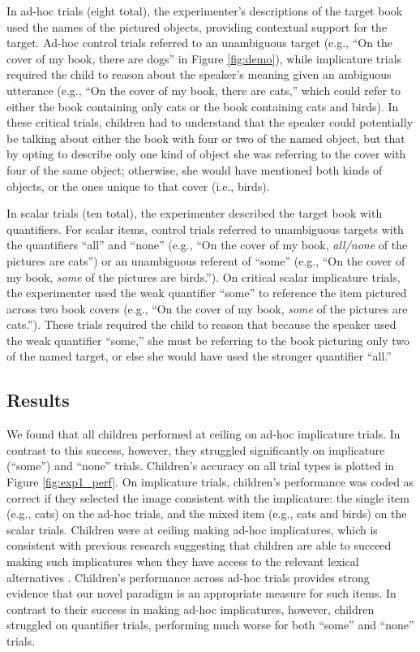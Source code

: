 \documentclass[man]{apa2}
\begin{document}
In ad-hoc trials (eight total), the experimenter's descriptions of the target book used the names of the pictured objects, providing contextual support for the target. Ad-hoc control trials referred to an unambiguous target (e.g., ``On the cover of my book, there are dogs'' in Figure \ref{fig:demo}), while implicature trials required the child to reason about the speaker's meaning given an ambiguous utterance (e.g., ``On the cover of my book, there are cats,'' which could refer to either the book containing only cats or the book containing cats and birds). In these critical trials, children had to understand that the speaker could potentially be talking about either the book with four or two of the named object, but that by opting to describe only one kind of object she was referring to the cover with four of the same object; otherwise, she would have mentioned both kinds of objects, or the ones unique to that cover (i.e., birds).

In scalar trials (ten total), the experimenter described the target book with quantifiers. For scalar items, control trials referred to unambiguous targets with the quantifiers ``all'' and ``none'' (e.g., ``On the cover of my book, \textit{all/none} of the pictures are cats'') or an unambiguous referent of ``some'' (e.g., ``On the cover of my book, \textit{some} of the pictures are birds.''). On critical scalar implicature trials, the experimenter used the weak quantifier ``some'' to reference the item pictured across two book covers (e.g., ``On the cover of my book, \textit{some} of the pictures are cats.''). These trials required the child to reason that because the speaker used the weak quantifier ``some,'' she must be referring to the book picturing only two of the named target, or else she would have used the stronger quantifier ``all.''

\subsection{Results}

We found that all children performed at ceiling on ad-hoc implicature trials. In contrast to this success, however, they struggled significantly on implicature (``some'') and ``none'' trials. Children's accuracy on all trial types is plotted in Figure \ref{fig:exp1_perf}. On implicature trials, children's performance was coded as correct if they selected the image consistent with the implicature: the single item (e.g., cats) on the ad-hoc trials, and the mixed item (e.g., cats and birds) on the scalar trials. Children were at ceiling making ad-hoc implicatures, which is consistent with previous research suggesting that children are able to succeed making such implicatures when they have access to the relevant lexical alternatives . Children's performance across ad-hoc trials provides strong evidence that our novel paradigm is an appropriate measure for such items. In contrast to their success in making ad-hoc implicatures, however, children struggled on quantifier trials, performing much worse for both ``some'' and ``none'' trials.
\end{document}
